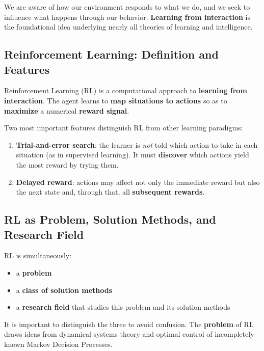 \documentclass[11pt,a4paper]{article}
\theoremstyle{definition}
\theoremstyle{plain}
\theoremstyle{remark}
\begin{document}
We are aware of how our environment responds to what we do, and we seek to influence what happens through our behavior. \textbf{Learning from interaction} is the foundational idea underlying nearly all theories of learning and intelligence.

\subsection{Reinforcement Learning: Definition and Features}

\begin{tcolorbox}[colback=blue!5!white,colframe=blue!75!black,title=\textbf{Reinforcement Learning}]
Reinforcement Learning (RL) is a computational approach to \textbf{learning from interaction}. The agent learns to \textbf{map situations to actions} so as to \textbf{maximize} a numerical \textbf{reward signal}.
\end{tcolorbox}

Two most important features distinguish RL from other learning paradigms:

\begin{enumerate}
    \item \textbf{Trial-and-error search}: the learner is \textit{not} told which action to take in each situation (as in supervised learning). It must \textbf{discover} which actions yield the most reward by trying them.
    \item \textbf{Delayed reward}: actions may affect not only the immediate reward but also the next state and, through that, all \textbf{subsequent rewards}.
\end{enumerate}

\subsection{RL as Problem, Solution Methods, and Research Field}

RL is simultaneously:
\begin{itemize}
    \item a \textbf{problem}
    \item a \textbf{class of solution methods}
    \item a \textbf{research field} that studies this problem and its solution methods
\end{itemize}

It is important to distinguish the three to avoid confusion. The \textbf{problem} of RL draws ideas from dynamical systems theory and optimal control of incompletely-known Markov Decision Processes.
\end{document}
